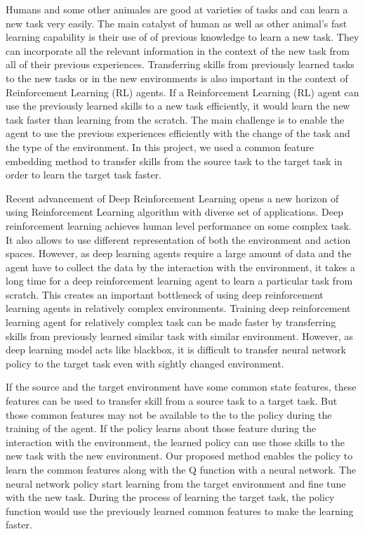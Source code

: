 \documentclass[letterpaper, 11 pt, conference]{ieeeconf}  %
\begin{document}
Humans and some other animales are good at varieties of tasks and can learn a new task very easily. The main catalyst of human as well as other animal's fast learning capability is  their use of of previous knowledge to learn a new task. They can incorporate all the relevant information in the context of the new task from all of their previous experiences. Transferring skills from previously learned tasks to the new tasks or in the new environments is also important in the context of Reinforcement Learning (RL)\cite{sutton1998introduction} agents. If a Reinforcement Learning (RL) agent can use the previously learned skills to a new task efficiently, it would learn the new task faster than learning from the scratch. The main challenge is to enable the agent to use the previous experiences efficiently with the change of the task and the type of the environment. In this project, we used a common feature embedding method to transfer skills from the source task to the target task in order to learn the target task faster. 
\linebreak
\par Recent advancement of Deep Reinforcement Learning\cite{mnih2013playing} opens a new horizon of using Reinforcement Learning algorithm with diverse set of applications. Deep reinforcement learning achieves human level performance on some complex task. It also allows to use different representation of both the environment and action spaces. However, as deep learning agents require a large amount of data and the agent have to collect the data by the interaction with the environment, it takes a long time for a deep reinforcement learning agent to learn a particular task from scratch. This creates an important bottleneck of using deep reinforcement learning agents in relatively complex environments. Training deep reinforcement learning agent for relatively complex task can be made faster by transferring skills from previously learned similar task with similar environment. However, as deep learning model acts like blackbox, it is difficult to transfer neural network policy to the target task even with sightly changed environment. 
\linebreak

\par If the source and the target environment have some common state features, these features can be used to transfer skill from a source task to a target task.  But those common features may not be available to the to the policy during the training of the agent. If the policy learns about those feature during the interaction with the environment, the learned policy can use those skills to the new task with the new environment. Our proposed method enables the policy to learn the common features along with the Q function with a neural network. The neural network policy start learning from the target environment and fine tune with the new task. During the process of learning the target task, the policy function would use the previously learned common features to make the learning faster. 
\linebreak
\par 



\end{document}
